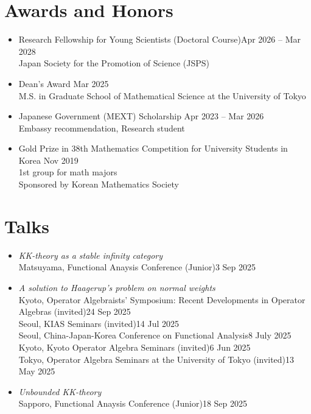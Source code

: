 \documentclass[11pt,a4paper]{article}
\begin{document}
\section*{Awards and Honors}
\begin{itemize}
\item
	Research Fellowship for Young Scientists (Doctoral Course)\hfill{\small Apr 2026 -- Mar 2028}\\
	Japan Society for the Promotion of Science (JSPS)
\item
	Dean's Award
	\hfill{\small Mar 2025}\\
	M.S. in Graduate School of Mathematical Science at the University of Tokyo
\item
	Japanese Government (MEXT) Scholarship
	\hfill{\small Apr 2023 -- Mar 2026}\\
	Embassy recommendation, Research student
\item
	Gold Prize in 38th Mathematics Competition for University Students in Korea
	\hfill{\small Nov 2019}\\
	1st group for math majors\\
	Sponsored by Korean Mathematics Society
\end{itemize}




\section*{Talks}
\begin{itemize}
\item
	\emph{KK-theory as a stable infinity category}\\
	Matsuyama, Functional Anaysis Conference (Junior)\hfill{3 Sep 2025}
\item
	\emph{A solution to Haagerup's problem on normal weights}\\
	Kyoto, Operator Algebraists’ Symposium: Recent Developments in Operator Algebras (invited)\hfill{24 Sep 2025}\\
	Seoul, KIAS Seminars (invited)\hfill{14 Jul 2025}\\
	Seoul, China-Japan-Korea Conference on Functional Analysis\hfill{8 July 2025}\\
	Kyoto, Kyoto Operator Algebra Seminars (invited)\hfill{6 Jun 2025}\\
	Tokyo, Operator Algebra Seminars at the University of Tokyo (invited)\hfill{13 May 2025}
\item
	\emph{Unbounded KK-theory}\\
	Sapporo, Functional Anaysis Conference (Junior)\hfill{18 Sep 2025}
\end{itemize}
\end{document}
